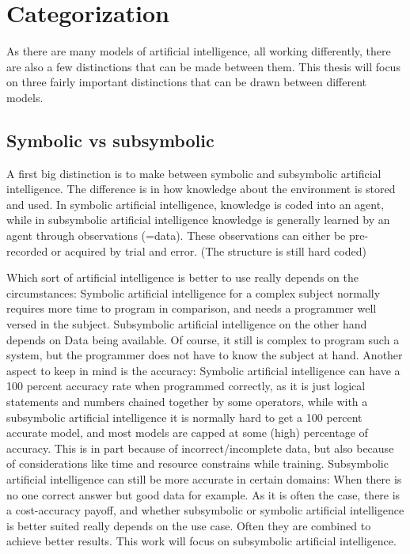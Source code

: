 \chapter{Categorization}
As there are many models of artificial intelligence, all working differently, there are also a few distinctions that can be made between them. This thesis will focus on three fairly important distinctions that can be drawn between different models.
\section{Symbolic vs subsymbolic} \cite{SymbolicVsSubsymbolic}
A first big distinction is to make between symbolic and subsymbolic artificial intelligence. 
The difference is in how knowledge about the environment is stored and used.
In symbolic artificial intelligence, knowledge is coded into an agent, while in subsymbolic artificial intelligence knowledge is generally learned by an agent through observations (=data). These observations can either be pre-recorded or acquired by trial and error. (The structure is still hard coded)

Which sort of artificial intelligence is better to use really depends on the circumstances: 
Symbolic artificial intelligence for a complex subject normally requires more time to program in comparison, and needs a programmer well versed in the subject. 
Subsymbolic artificial intelligence on the other hand depends on Data being available. Of course, it still is complex to program such a system, but the programmer does not have to know the subject at hand. %
Another aspect to keep in mind is the accuracy: Symbolic artificial intelligence can have a 100 percent accuracy rate when programmed correctly, as it is just logical statements and numbers chained together by some operators, while with a subsymbolic artificial intelligence it is normally hard to get a 100 percent accurate model, and most models are capped at some (high) percentage of accuracy. This is in part because of incorrect/incomplete data, but also because of considerations like time and resource constrains while training. Subsymbolic artificial intelligence can still be more accurate in certain domains: When there is no one correct answer but good data for example.
As it is often the case, there is a cost-accuracy payoff, and whether subsymbolic or symbolic artificial intelligence is better suited really depends on the use case. Often they are combined to achieve better results. This work will focus on subsymbolic artificial intelligence. 

